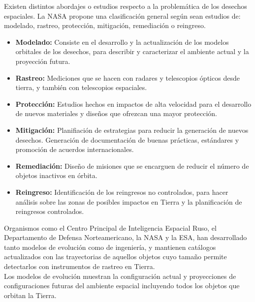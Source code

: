 Existen distintos abordajes o estudios respecto a la problem\'atica de los desechos espaciales. La \ac{NASA} propone una clasificaci\'on general seg\'un sean estudios de: modelado, rastreo, protecci\'on, mitigaci\'on, remediaci\'on o reingreso.\\
\begin{itemize}
\item {\bf{Modelado:}} Consiste en el desarrollo y la actualizaci\'on de los modelos orbitales de los desechos, para describir y caracterizar el ambiente actual y la proyecci\'on futura.\\
\item {\bf{Rastreo:}} Mediciones que se hacen con radares y telescopios \'opticos desde tierra, y tambi\'en con telescopios espaciales.\\
\item {\bf{Protecci\'on:}} Estudios hechos en impactos de alta velocidad para el desarrollo de nuevos materiales y dise\~nos que ofrezcan una mayor protecci\'on.\\
\item {\bf{Mitigaci\'on:}} Planifiaci\'on de estrategias para reducir la generaci\'on de nuevos desechos. Generaci\'on de documentaci\'on  de buenas pr\'acticas, est\'andares y promoci\'on de acuerdos internacionales.\\
\item {\bf{Remediaci\'on:}} Dise\~no de misiones que se encarguen de reducir el n\'umero de objetos inactivos en \'orbita.\\
\item {\bf{Reingreso:}} Identificaci\'on de los reingresos no controlados, para hacer an\'alisis sobre las zonas de posibles impactos en Tierra y la planificaci\'on de reingresos controlados.\\
\end{itemize}

Organismos como el Centro Principal de Inteligencia Espacial Ruso, el Departamento de Defensa Norteamericano, la NASA y la \ac{ESA}, han desarrollado tanto modelos de evoluci\'on como de ingenier\'ia, y mantienen cat\'alogos actualizados con las trayectorias de aquellos objetos cuyo tama\~no permite detectarlos con instrumentos de rastreo en Tierra.\\

Los modelos de evoluci\'on muestran la configuraci\'on actual y proyecciones de configuraciones futuras del ambiente espacial incluyendo todos los objetos que orbitan la Tierra.\\

